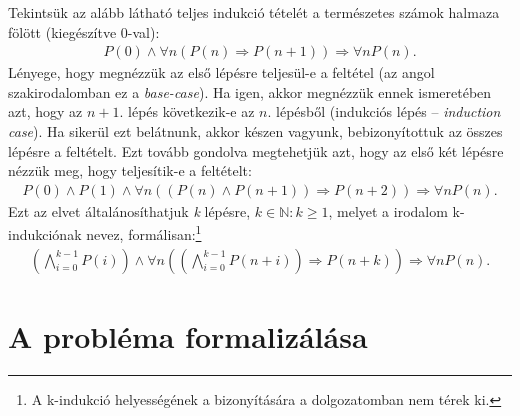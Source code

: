 Tekintsük az alább látható teljes indukció tételét a természetes számok halmaza fölött (kiegészítve 0-val): 
\begin{align}
	P(0) \wedge \forall n (P(n) \Rightarrow P(n+1)) \Rightarrow \forall nP(n).
\end{align}
Lényege, hogy megnézzük az első lépésre teljesül-e a feltétel (az angol szakirodalomban ez a \emph{base-case}). Ha igen, akkor megnézzük ennek ismeretében azt, hogy az $n+1$. lépés következik-e az $n$. lépésből (indukciós lépés -- \emph{induction case}). Ha sikerül ezt belátnunk, akkor készen vagyunk, bebizonyítottuk az összes lépésre a feltételt.
\newline
\newline
Ezt tovább gondolva megtehetjük azt, hogy az első két lépésre nézzük meg, hogy teljesítik-e a feltételt:
\begin{align}
	P(0) \wedge P(1) \wedge \forall n ((P(n) \wedge P(n+1)) \Rightarrow P(n+2) ) \Rightarrow \forall n P(n).
\end{align}
Ezt az elvet általánosíthatjuk \emph{k} lépésre, $k \in \mathbb{N} : k \geq 1$, melyet a irodalom \cite{k_induction_principle} k-indukciónak nevez, formálisan:\footnote{A k-indukció helyességének a bizonyítására a dolgozatomban nem térek ki.}
\begin{align}
	\left( \bigwedge_{i=0}^{k-1} P(i) \right) \wedge \forall n \left( \left( \bigwedge_{i=0}^{k-1} P(n+i) \right) \Rightarrow P(n+k) \right) \Rightarrow \forall n P(n).
\end{align}

\section{A probléma formalizálása}
\label{sec:problema_form}

